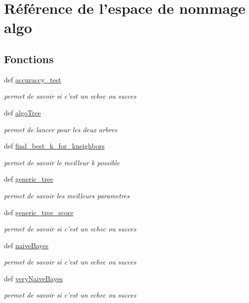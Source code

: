 \hypertarget{namespacealgo}{\section{Référence de l'espace de nommage algo}
\label{namespacealgo}
}
\subsection*{Fonctions}
\begin{DoxyCompactItemize}
\item 
def \hyperlink{namespacealgo_a802d43423d0ac8fd6a52cc2508186072}{accuraccy\-\_\-test}
\begin{DoxyCompactList}\small\item\em permet de savoir si c'est un echec ou succes \end{DoxyCompactList}\item 
def \hyperlink{namespacealgo_ab46541a846c7f71c15e9bae5d5836af7}{algo\-Tree}
\begin{DoxyCompactList}\small\item\em permet de lancer pour les deux arbres \end{DoxyCompactList}\item 
def \hyperlink{namespacealgo_a70c4b2737389dbfb07be3b39a8cf8e9b}{find\-\_\-best\-\_\-k\-\_\-for\-\_\-kneighbors}
\begin{DoxyCompactList}\small\item\em permet de savoir le meilleur k possible \end{DoxyCompactList}\item 
def \hyperlink{namespacealgo_a4227080ec2328a03c4f6f01e7b022e08}{generic\-\_\-tree}
\begin{DoxyCompactList}\small\item\em permet de savoir les meilleurs parametres \end{DoxyCompactList}\item 
def \hyperlink{namespacealgo_a0afe8d007fc92279c75be5d0b40ecf07}{generic\-\_\-tree\-\_\-score}
\begin{DoxyCompactList}\small\item\em permet de savoir si c'est un echec ou succes \end{DoxyCompactList}\item 
def \hyperlink{namespacealgo_a5ecd48a13b42118beac0652265b8f353}{naive\-Bayes}
\begin{DoxyCompactList}\small\item\em permet de savoir si c'est un echec ou succes \end{DoxyCompactList}\item 
def \hyperlink{namespacealgo_a9420060c614f9fb33cf05c91da71aee9}{very\-Naive\-Bayes}
\begin{DoxyCompactList}\small\item\em permet de savoir si c'est un echec ou succes \end{DoxyCompactList}\end{DoxyCompactItemize}


